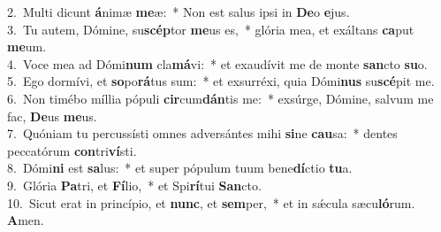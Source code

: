 {2.~}Multi dicunt \textbf{á}nimæ \textbf{me}æ:~* Non est salus ipsi in \textbf{De}o \textbf{e}jus.\\
{3.~}Tu autem, Dómine, su\textbf{scép}tor \textbf{me}us es,~* glória mea, et exáltans \textbf{ca}put \textbf{me}um.\\
{4.~}Voce mea ad Dómi\textbf{num} cla\textbf{má}vi:~* et exaudívit me de monte \textbf{san}cto \textbf{su}o.\\
{5.~}Ego dormívi, et \textbf{so}po\textbf{rá}tus sum:~* et exsurréxi, quia Dómi\textbf{nus} su\textbf{scé}pit me.\\
{6.~}Non timébo míllia pópuli \textbf{cir}cum\textbf{dán}tis me:~* exsúrge, Dómine, salvum me fac, \textbf{De}us \textbf{me}us.\\
{7.~}Quóniam tu percussísti omnes adversántes mihi \textbf{si}ne \textbf{cau}sa:~* dentes peccatórum \textbf{con}tri\textbf{ví}sti.\\
{8.~}Dómi\textbf{ni} est \textbf{sa}lus:~* et super pópulum tuum bene\textbf{dí}ctio \textbf{tu}a.\\
{9.~}Glória \textbf{Pa}tri, et \textbf{Fí}lio,~* et Spi\textbf{rí}tui \textbf{San}cto.\\
{10.~}Sicut erat in princípio, et \textbf{nunc}, et \textbf{sem}per,~* et in sǽcula sæcu\textbf{ló}rum. \textbf{A}men.\\
